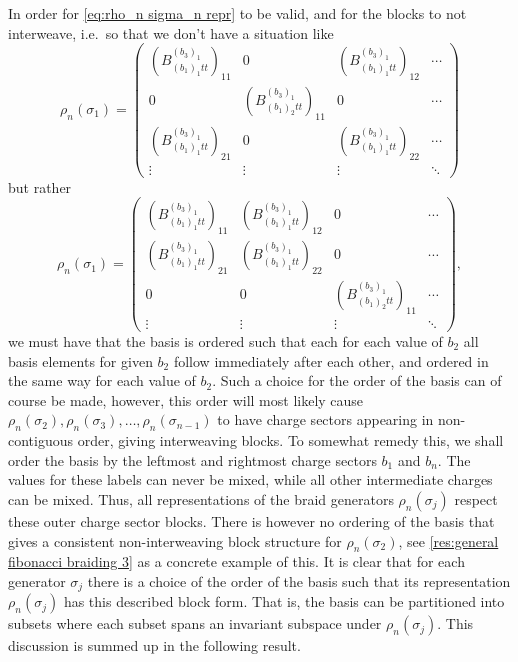 In order for \cref{eq:rho_n sigma_n repr} to be valid, and for the blocks to not interweave, i.e.\ so that we don't have a situation like
\begin{equation}
  ρ_n(σ_1) =
  \begin{pmatrix}
    \left(B_{(b_1)_1 t t}^{(b_3)_1}\right)_{11} & 0 & \left(B_{(b_1)_1 t t}^{(b_3)_1}\right)_{12} & \cdots \\
    0 & \left(B_{(b_1)_2 t t}^{(b_3)_1}\right)_{11} & 0 & \cdots \\
    \left(B_{(b_1)_1 t t}^{(b_3)_1}\right)_{21} & 0 & \left(B_{(b_1)_1 t t}^{(b_3)_1}\right)_{22} & \cdots \\
    \vdots & \vdots & \vdots & \ddots
  \end{pmatrix}
\end{equation}
but rather
\begin{equation}
  ρ_n(σ_1) =
  \begin{pmatrix}
    \left(B_{(b_1)_1 t t}^{(b_3)_1}\right)_{11} & \left(B_{(b_1)_1 t t}^{(b_3)_1}\right)_{12} & 0 & \cdots \\
    \left(B_{(b_1)_1 t t}^{(b_3)_1}\right)_{21} & \left(B_{(b_1)_1 t t}^{(b_3)_1}\right)_{22} & 0 & \cdots \\
    0 & 0 & \left(B_{(b_1)_2 t t}^{(b_3)_1}\right)_{11} & \cdots \\
    \vdots & \vdots & \vdots & \ddots
  \end{pmatrix},
\end{equation}
we must have that the basis is ordered such that each for each value of $b_2$ all basis elements for given $b_2$ follow immediately after each other, and ordered in the same way for each value of $b_2$. Such a choice for the order of the basis can of course be made, however, this order will most likely cause $ρ_n(σ_2), ρ_n(σ_3), \dots, ρ_n(σ_{n-1})$ to have charge sectors appearing in non-contiguous order, giving interweaving blocks. To somewhat remedy this, we shall order the basis by the leftmost and rightmost charge sectors $b_1$ and $b_n$. The values for these labels can never be mixed, while all other intermediate charges can be mixed. Thus, all representations of the braid generators $ρ_n(σ_j)$ respect these outer charge sector blocks. There is however no ordering of the basis that gives a consistent non-interweaving block structure for $ρ_n(σ_2)$, see \cref{res:general fibonacci braiding 3} as a concrete example of this. It is clear that for each generator $σ_j$ there is a choice of the order of the basis such that its representation $ρ_n(σ_j)$ has this described block form. That is, the basis can be partitioned into subsets where each subset spans an invariant subspace under $ρ_n(σ_j)$. This discussion is summed up in the following result.

